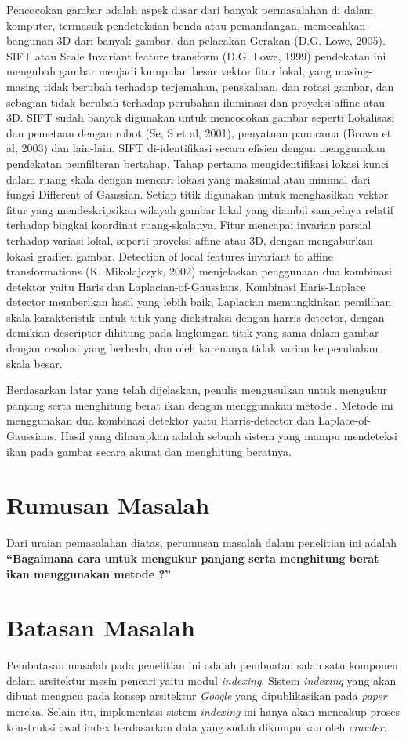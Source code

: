 Pencocokan gambar adalah aspek dasar dari banyak permasalahan di dalam komputer, termasuk  pendeteksian benda atau pemandangan, memecahkan bangunan 3D dari banyak gambar, 
dan pelacakan Gerakan (D.G. Lowe, 2005). SIFT atau Scale Invariant feature transform (D.G. Lowe, 1999) pendekatan ini mengubah gambar menjadi kumpulan besar vektor fitur lokal, 
yang masing-masing tidak berubah terhadap terjemahan, penskalaan, dan rotasi gambar, dan sebagian tidak berubah terhadap perubahan iluminasi 
dan proyeksi affine atau 3D. SIFT sudah banyak digunakan untuk mencocokan gambar seperti Lokalisasi dan pemetaan dengan robot (Se, S et al, 2001), penyatuan panorama (Brown et al, 2003) dan lain-lain. 
SIFT di-identifikasi secara efisien dengan menggunakan pendekatan pemfilteran bertahap. Tahap pertama mengidentifikasi lokasi kunci dalam ruang skala dengan mencari lokasi yang maksimal atau minimal dari fungsi Different of Gaussian. 
Setiap titik digunakan untuk menghasilkan vektor fitur yang mendeskripsikan wilayah gambar lokal yang diambil sampelnya relatif terhadap bingkai koordinat ruang-skalanya. Fitur mencapai invarian parsial terhadap variasi lokal, 
seperti proyeksi affine atau 3D, dengan mengaburkan lokasi gradien gambar. Detection of local features invariant to affine transformations (K. Mikolajczyk, 2002) menjelaskan penggunaan dua kombinasi detektor yaitu Haris dan Laplacian-of-Gaussians. 
Kombinasi Haris-Laplace detector memberikan hasil yang lebih baik, Laplacian memungkinkan pemilihan skala karakteristik untuk titik yang diekstraksi dengan harris detector, dengan demikian descriptor dihitung pada lingkungan titik yang sama dalam gambar dengan resolusi yang berbeda, 
dan oleh karenanya tidak varian ke perubahan skala besar.
 
Berdasarkan latar yang telah dijelaskan, penulis mengusulkan untuk mengukur panjang serta menghitung berat ikan dengan menggunakan metode . 
Metode ini menggunakan dua kombinasi detektor yaitu Harris-detector dan Laplace-of-Gaussians. Hasil yang diharapkan adalah sebuah sistem yang mampu mendeteksi ikan pada gambar secara akurat dan menghitung beratnya.


\section{Rumusan Masalah}
Dari uraian pemasalahan diatas, perumusan masalah dalam penelitian ini adalah \textbf{“Bagaimana cara untuk mengukur panjang serta menghitung berat ikan menggunakan metode \emph{}?”}

\section{Batasan Masalah}
Pembatasan masalah pada penelitian ini adalah pembuatan salah satu komponen 
dalam arsitektur mesin pencari yaitu modul \emph{indexing}. Sistem
\emph{indexing} yang akan dibuat mengacu pada konsep arsitektur \emph{Google} 
yang dipublikasikan pada \textit{paper} mereka. Selain itu, implementasi
sistem \textit{indexing} ini hanya akan mencakup proses konstruksi awal index
berdasarkan data yang sudah dikumpulkan oleh \textit{crawler}.

